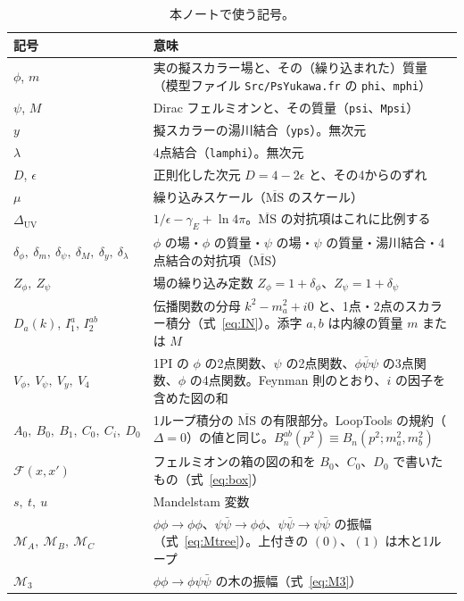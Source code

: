 \documentclass[a4paper,10pt]{ltjsarticle}
\newcommand{\MSbar}{\overline{\mathrm{MS}}}
\begin{document}
\begin{table}[tbp]
\centering\small
\caption{本ノートで使う記号。}
\label{tab:notation}
\begin{tabularx}{\linewidth}{>{\raggedright\arraybackslash}p{3.6cm}X}
\toprule
\textbf{記号} & \textbf{意味} \\
\midrule
$\phi$, $m$ & 実の擬スカラー場と、その（繰り込まれた）質量（模型ファイル \texttt{Src/PsYukawa.fr} の \texttt{phi}、\texttt{mphi}） \\
$\psi$, $M$ & Dirac フェルミオンと、その質量（\texttt{psi}、\texttt{Mpsi}） \\
$y$ & 擬スカラーの湯川結合（\texttt{yps}）。無次元 \\
$\lambda$ & 4点結合（\texttt{lamphi}）。無次元 \\
$D$, $\epsilon$ & 正則化した次元 $D=4-2\epsilon$ と、その4からのずれ \\
$\mu$ & 繰り込みスケール（$\MSbar$ のスケール） \\
$\Delta_{\mathrm{UV}}$ & $1/\epsilon-\gamma_E+\ln4\pi$。$\MSbar$ の対抗項はこれに比例する \\
$\delta_\phi,\ \delta_m,\ \delta_\psi,\ \delta_M,\ \delta_y,\ \delta_\lambda$ & $\phi$ の場・$\phi$ の質量・$\psi$ の場・$\psi$ の質量・湯川結合・4点結合の対抗項（$\MSbar$） \\
$Z_\phi,\ Z_\psi$ & 場の繰り込み定数 $Z_\phi=1+\delta_\phi$、$Z_\psi=1+\delta_\psi$ \\
$D_a(k)$, $I_1^a$, $I_2^{ab}$ & 伝播関数の分母 $k^2-m_a^2+i0$ と、1点・2点のスカラー積分（式~\eqref{eq:IN}）。添字 $a,b$ は内線の質量 $m$ または $M$ \\
$V_\phi,\ V_\psi,\ V_y,\ V_4$ & 1PI の $\phi$ の2点関数、$\psi$ の2点関数、$\phi\bar\psi\psi$ の3点関数、$\phi$ の4点関数。Feynman 則のとおり、$i$ の因子を含めた図の和 \\
$A_0,\ B_0,\ B_1,\ C_0,\ C_i,\ D_0$ & 1ループ積分の $\MSbar$ の有限部分。LoopTools の規約（$\Delta=0$）の値と同じ。$B^{ab}_n(p^2)\equiv B_n(p^2;m_a^2,m_b^2)$ \\
$\mathcal F(x,x')$ & フェルミオンの箱の図の和を $B_0$、$C_0$、$D_0$ で書いたもの（式~\eqref{eq:box}） \\
$s,\ t,\ u$ & Mandelstam 変数 \\
$\mathcal{M}_A,\ \mathcal{M}_B,\ \mathcal{M}_C$ & $\phi\phi\to\phi\phi$、$\psi\bar\psi\to\phi\phi$、$\psi\bar\psi\to\psi\bar\psi$ の振幅（式~\eqref{eq:Mtree}）。上付きの $(0)$、$(1)$ は木と1ループ \\
$\mathcal{M}_3$ & $\phi\phi\to\phi\psi\bar\psi$ の木の振幅（式~\eqref{eq:M3}） \\

\end{tabularx}
\end{table}
\end{document}
